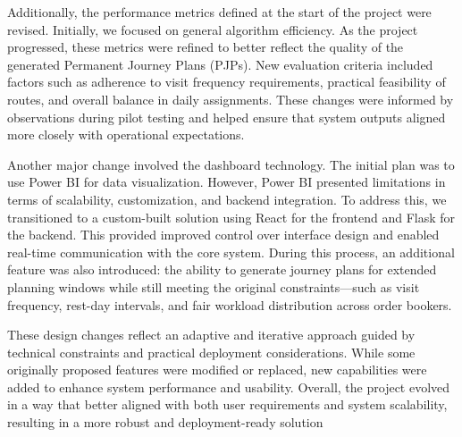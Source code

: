 Additionally, the performance metrics defined at the start of the project were revised. Initially, we focused on general algorithm efficiency. As the project progressed, these metrics were refined to better reflect the quality of the generated Permanent Journey Plans (PJPs). New evaluation criteria included factors such as adherence to visit frequency requirements, practical feasibility of routes, and overall balance in daily assignments. These changes were informed by observations during pilot testing and helped ensure that system outputs aligned more closely with operational expectations.

Another major change involved the dashboard technology. The initial plan was to use Power BI for data visualization. However, Power BI presented limitations in terms of scalability, customization, and backend integration. To address this, we transitioned to a custom-built solution using React for the frontend and Flask for the backend. This provided improved control over interface design and enabled real-time communication with the core system. During this process, an additional feature was also introduced: the ability to generate journey plans for extended planning windows while still meeting the original constraints—such as visit frequency, rest-day intervals, and fair workload distribution across order bookers.

These design changes reflect an adaptive and iterative approach guided by technical constraints and practical deployment considerations. While some originally proposed features were modified or replaced, new capabilities were added to enhance system performance and usability. Overall, the project evolved in a way that better aligned with both user requirements and system scalability, resulting in a more robust and deployment-ready solution